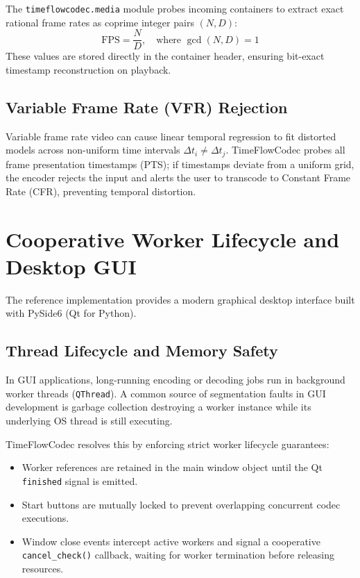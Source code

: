The \texttt{timeflowcodec.media} module probes incoming containers to extract exact rational frame rates as coprime integer pairs $(N, D)$:
\begin{equation}
    \text{FPS} = \frac{N}{D}, \quad \text{where } \gcd(N, D) = 1
\end{equation}
These values are stored directly in the container header, ensuring bit-exact timestamp reconstruction on playback.

\subsection{Variable Frame Rate (VFR) Rejection}
Variable frame rate video can cause linear temporal regression to fit distorted models across non-uniform time intervals $\Delta t_i \ne \Delta t_j$. TimeFlowCodec probes all frame presentation timestamps (PTS); if timestamps deviate from a uniform grid, the encoder rejects the input and alerts the user to transcode to Constant Frame Rate (CFR), preventing temporal distortion.

\section{Cooperative Worker Lifecycle and Desktop GUI}
The reference implementation provides a modern graphical desktop interface built with PySide6 (Qt for Python). 

\subsection{Thread Lifecycle and Memory Safety}
In GUI applications, long-running encoding or decoding jobs run in background worker threads (\texttt{QThread}). A common source of segmentation faults in GUI development is garbage collection destroying a worker instance while its underlying OS thread is still executing.

TimeFlowCodec resolves this by enforcing strict worker lifecycle guarantees:
\begin{itemize}
    \item Worker references are retained in the main window object until the Qt \texttt{finished} signal is emitted.
    \item Start buttons are mutually locked to prevent overlapping concurrent codec executions.
    \item Window close events intercept active workers and signal a cooperative \texttt{cancel\_check()} callback, waiting for worker termination before releasing resources.
\end{itemize}

